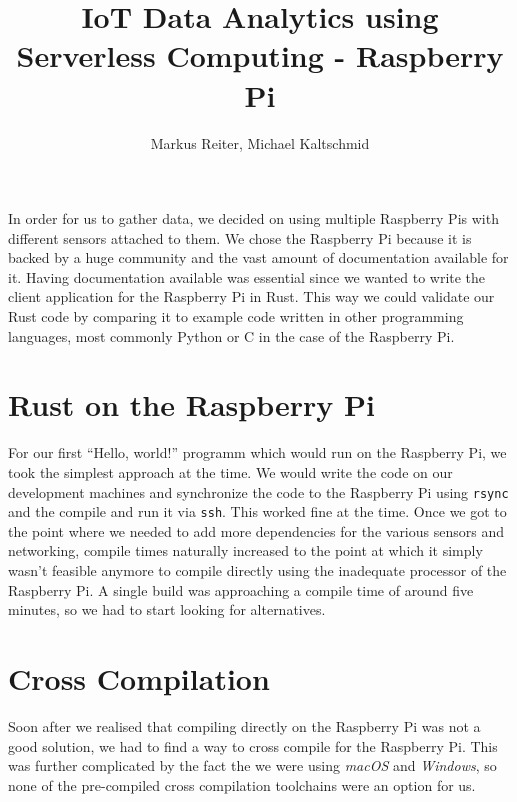 \documentclass{article}
\title{IoT Data Analytics using Serverless Computing - Raspberry Pi}
\author{Markus Reiter, Michael Kaltschmid}
\date{}
\begin{document}
  \maketitle

  In order for us to gather data, we decided on using multiple Raspberry Pis with different sensors attached to them. We chose the Raspberry Pi because it is backed by a huge community and the vast amount of documentation available for it. Having documentation available was essential since we wanted to write the client application for the Raspberry Pi in Rust. This way we could validate our Rust code by comparing it to example code written in other programming languages, most commonly Python or C in the case of the Raspberry Pi.

  \section{Rust on the Raspberry Pi}

  For our first “Hello, world!” programm which would run on the Raspberry Pi, we took the simplest approach at the time. We would write the code on our development machines and synchronize the code to the Raspberry Pi using \texttt{rsync} and the compile and run it via \texttt{ssh}. This worked fine at the time. Once we got to the point where we needed to add more dependencies for the various sensors and networking, compile times naturally increased to the point at which it simply wasn't feasible anymore to compile directly using the inadequate processor of the Raspberry Pi. A single build was approaching a compile time of around five minutes, so we had to start looking for alternatives.

  \section{Cross Compilation}

  Soon after we realised that compiling directly on the Raspberry Pi was not a good solution, we had to find a way to cross compile for the Raspberry Pi. This was further complicated by the fact the we were using \textit{macOS} and \textit{Windows}, so none of the pre-compiled cross compilation toolchains were an option for us.
\end{document}
